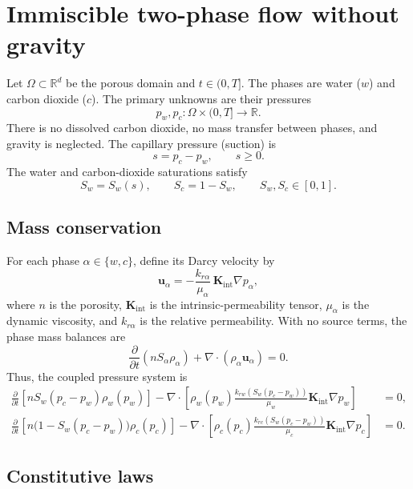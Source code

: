 \documentclass{article}
\newcommand{\grad}{\nabla}
\newcommand{\divergence}{\nabla\!\cdot}
\begin{document}
\section*{Immiscible two-phase flow without gravity}

Let $\Omega\subset\mathbb{R}^{d}$ be the porous domain and
$t\in(0,T]$.  The phases are water ($w$) and carbon dioxide ($c$).
The primary unknowns are their pressures
\[
    p_w,p_c:\Omega\times(0,T]\longrightarrow\mathbb{R}.
\]
There is no dissolved carbon dioxide, no mass transfer between phases,
and gravity is neglected.  The capillary pressure (suction) is
\[
    s = p_c-p_w,\qquad s\geq 0.
\]
The water and carbon-dioxide saturations satisfy
\[
    S_w=S_w(s),\qquad S_c=1-S_w,\qquad
    S_w,S_c\in[0,1].
\]

\subsection*{Mass conservation}

For each phase $\alpha\in\{w,c\}$, define its Darcy velocity by
\[
    \boldsymbol{u}_{\alpha}
    =
    -\frac{k_{r\alpha}}{\mu_\alpha}\,
     \boldsymbol{K}_{\mathrm{int}}\grad p_\alpha ,
\]
where $n$ is the porosity, $\boldsymbol{K}_{\mathrm{int}}$ is the
intrinsic-permeability tensor, $\mu_\alpha$ is the dynamic viscosity,
and $k_{r\alpha}$ is the relative permeability.  With no source terms,
the phase mass balances are
\[
    \frac{\partial}{\partial t}\left(nS_\alpha\rho_\alpha\right)
    +\divergence\left(\rho_\alpha\boldsymbol{u}_\alpha\right)=0.
\]
Thus, the coupled pressure system is
\begin{align}
    \frac{\partial}{\partial t}
    \left[
        nS_w(p_c-p_w)\rho_w(p_w)
    \right]
    -
    \divergence\left[
        \rho_w(p_w)
        \frac{k_{rw}(S_w(p_c-p_w))}{\mu_w}
        \boldsymbol{K}_{\mathrm{int}}\grad p_w
    \right]
    &=0,
    \label{eq:water_mass}
    \\
    \frac{\partial}{\partial t}
    \left[
        n\bigl(1-S_w(p_c-p_w)\bigr)\rho_c(p_c)
    \right]
    -
    \divergence\left[
        \rho_c(p_c)
        \frac{k_{rc}(S_w(p_c-p_w))}{\mu_c}
        \boldsymbol{K}_{\mathrm{int}}\grad p_c
    \right]
    &=0.
    \label{eq:co2_mass}
\end{align}

\subsection*{Constitutive laws}
\end{document}
